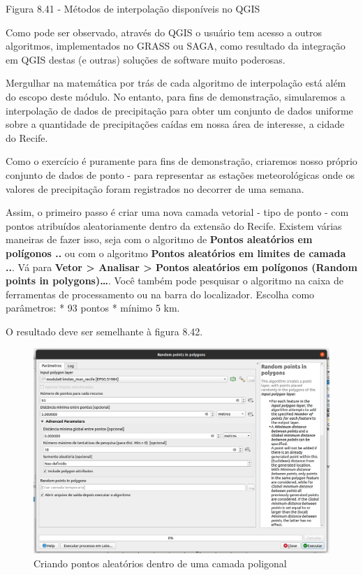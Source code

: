 \documentclass[
  portuguese,
]{krantz}
\begin{document}
Figura 8.41 - Métodos de interpolação disponíveis no QGIS

Como pode ser observado, através do QGIS o usuário tem acesso a outros algoritmos, implementados no GRASS ou SAGA, como resultado da integração em QGIS destas (e outras) soluções de software muito poderosas.

Mergulhar na matemática por trás de cada algoritmo de interpolação está além do escopo deste módulo. No entanto, para fins de demonstração, simularemos a interpolação de dados de precipitação para obter um conjunto de dados uniforme sobre a quantidade de precipitações caídas em nossa área de interesse, a cidade do Recife.

Como o exercício é puramente para fins de demonstração, criaremos nosso próprio conjunto de dados de ponto - para representar as estações meteorológicas onde os valores de precipitação foram registrados no decorrer de uma semana.

Assim, o primeiro passo é criar uma nova camada vetorial - tipo de ponto - com pontos atribuídos aleatoriamente dentro da extensão do Recife. Existem várias maneiras de fazer isso, seja com o algoritmo de \textbf{Pontos aleatórios em polígonos ..} ou com o algoritmo \textbf{Pontos aleatórios em limites de camada ..}. Vá para \textbf{Vetor \textgreater{} Analisar \textgreater{} Pontos aleatórios em polígonos (Random points in polygons)\ldots{}}. Você também pode pesquisar o algoritmo na caixa de ferramentas de processamento ou na barra do localizador. Escolha como parâmetros:
* 93 pontos
* mínimo 5 km.

O resultado deve ser semelhante à figura 8.42.

\begin{figure}
\centering
\includegraphics{media/modulo8/fig842.png}
\caption{Criando pontos aleatórios dentro de uma camada poligonal}
\end{figure}
\end{document}
